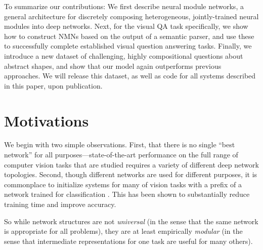 To summarize our contributions: We first describe neural module networks, a
general architecture for discretely composing heterogeneous, jointly-trained
neural modules into deep networks. Next, for the visual QA task specifically, we
show how to construct NMNs based on the output of a semantic parser, and use
these to successfully complete established visual question answering tasks.
Finally, we introduce a new dataset of challenging, highly compositional
questions about abstract shapes, and show that our model again outperforms
previous approaches. We will release this dataset, as well as code for all
systems described in this paper, upon publication.

\section{Motivations}

%
We begin with two simple observations. First, that there is no single ``best
network'' for all purposes---state-of-the-art performance on the full range of
computer vision tasks that are studied requires a variety of different deep
network topologies. Second, though different networks are used for different
purposes, it is commonplace to initialize systems for many of vision tasks with
a prefix of a network trained for classification \cite{Girshick14RCNN}. 
This has been shown to substantially reduce training time and improve accuracy. 

So while network structures are not \emph{universal} (in the sense that the same
network is appropriate for all problems), they are at least empirically
\emph{modular} (in the sense that intermediate representations for one task are
useful for many others). 

